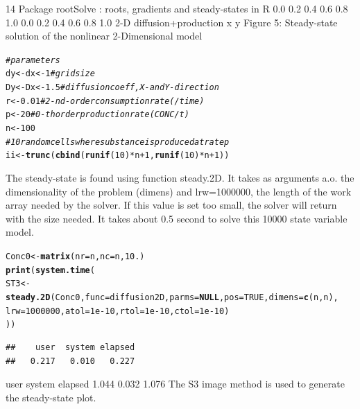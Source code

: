 \documentclass{tufte-handout}\usepackage[]{graphicx}\usepackage[]{xcolor}
\makeatletter
\newcommand{\hlnum}[1]{\textcolor[rgb]{0.686,0.059,0.569}{#1}}%
\newcommand{\hlcom}[1]{\textcolor[rgb]{0.678,0.584,0.686}{\textit{#1}}}%
\newcommand{\hlopt}[1]{\textcolor[rgb]{0,0,0}{#1}}%
\newcommand{\hlstd}[1]{\textcolor[rgb]{0.345,0.345,0.345}{#1}}%
\newcommand{\hlkwa}[1]{\textcolor[rgb]{0.161,0.373,0.58}{\textbf{#1}}}%
\newcommand{\hlkwb}[1]{\textcolor[rgb]{0.69,0.353,0.396}{#1}}%
\newcommand{\hlkwc}[1]{\textcolor[rgb]{0.333,0.667,0.333}{#1}}%
\newcommand{\hlkwd}[1]{\textcolor[rgb]{0.737,0.353,0.396}{\textbf{#1}}}%
\newenvironment{kframe}{%
 \def\at@end@of@kframe{}%
 \ifinner\ifhmode%
  \def\at@end@of@kframe{\end{minipage}}%
  \begin{minipage}{\columnwidth}%
 \fi\fi%
 \def\FrameCommand##1{\hskip\@totalleftmargin \hskip-\fboxsep
 \colorbox{shadecolor}{##1}\hskip-\fboxsep
     \hskip-\linewidth \hskip-\@totalleftmargin \hskip\columnwidth}%
 \MakeFramed {\advance\hsize-\width
   \@totalleftmargin\z@ \linewidth\hsize
   \@setminipage}}%
 {\par\unskip\endMakeFramed%
 \at@end@of@kframe}
\newenvironment{knitrout}{}{} %
\makeatother
\begin{document}
14 Package rootSolve : roots, gradients and steady-states in R
0.0 0.2 0.4 0.6 0.8 1.0
0.0 0.2 0.4 0.6 0.8 1.0
2-D diffusion+production
x
y
Figure 5: Steady-state solution of the nonlinear 2-Dimensional model
\begin{knitrout}
\color{fgcolor}\begin{kframe}
\begin{alltt}
\hlcom{# parameters}
\hlstd{dy} \hlkwb{<-} \hlstd{dx} \hlkwb{<-} \hlnum{1} \hlcom{# grid size}
\hlstd{Dy} \hlkwb{<-} \hlstd{Dx} \hlkwb{<-} \hlnum{1.5} \hlcom{# diffusion coeff, X- and Y-direction}
\hlstd{r} \hlkwb{<-} \hlnum{0.01} \hlcom{# 2-nd-order consumption rate (/time)}
\hlstd{p} \hlkwb{<-} \hlnum{20} \hlcom{# 0-th order production rate (CONC/t)}
\hlstd{n} \hlkwb{<-} \hlnum{100}
\hlcom{# 10 random cells where substance is produced at rate p}
\hlstd{ii} \hlkwb{<-} \hlkwd{trunc}\hlstd{(}\hlkwd{cbind}\hlstd{(}\hlkwd{runif}\hlstd{(}\hlnum{10}\hlstd{)}\hlopt{*}\hlstd{n}\hlopt{+}\hlnum{1}\hlstd{,}\hlkwd{runif}\hlstd{(}\hlnum{10}\hlstd{)}\hlopt{*}\hlstd{n}\hlopt{+}\hlnum{1}\hlstd{))}
\end{alltt}
\end{kframe}
\end{knitrout}
The steady-state is found using function steady.2D. It takes as arguments a.o. the dimensionality
of the problem (dimens) and lrw=1000000, the length of the work array needed by
the solver. If this value is set too small, the solver will return with the size needed.
It takes about 0.5 second to solve this 10000 state variable model.
\begin{knitrout}
\color{fgcolor}\begin{kframe}
\begin{alltt}
\hlstd{Conc0} \hlkwb{<-} \hlkwd{matrix}\hlstd{(}\hlkwc{nr}\hlstd{=n,}\hlkwc{nc}\hlstd{=n,}\hlnum{10.}\hlstd{)}
\hlkwd{print}\hlstd{(}\hlkwd{system.time}\hlstd{(}
\hlstd{ST3} \hlkwb{<-} \hlkwd{steady.2D}\hlstd{(Conc0,}\hlkwc{func}\hlstd{=diffusion2D,}\hlkwc{parms}\hlstd{=}\hlkwa{NULL}\hlstd{,}\hlkwc{pos}\hlstd{=}\hlnum{TRUE}\hlstd{,}\hlkwc{dimens}\hlstd{=}\hlkwd{c}\hlstd{(n,n),}
\hlkwc{lrw}\hlstd{=}\hlnum{1000000}\hlstd{,}\hlkwc{atol}\hlstd{=}\hlnum{1e-10}\hlstd{,}\hlkwc{rtol}\hlstd{=}\hlnum{1e-10}\hlstd{,}\hlkwc{ctol}\hlstd{=}\hlnum{1e-10}\hlstd{)}
\hlstd{))}
\end{alltt}
\begin{verbatim}
##    user  system elapsed 
##   0.217   0.010   0.227
\end{verbatim}
\end{kframe}
\end{knitrout}
user system elapsed
1.044 0.032 1.076
The S3 image method is used to generate the steady-state plot.
\end{document}
